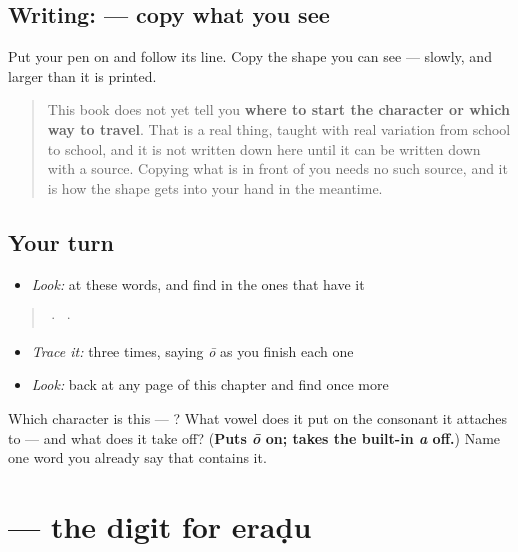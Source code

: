 \subsection*{Writing:  — copy what you see}
Put your pen on  and follow its line. Copy the shape you can see — slowly, and larger than it is printed.

\begin{quote}
This book does not yet tell you \textbf{where to start the character or which way to travel}. That is a real thing, taught with real variation from school to school, and it is not written down here until it can be written down with a source. Copying what is in front of you needs no such source, and it is how the shape gets into your hand in the meantime.
\end{quote}

\subsection*{Your turn}
\begin{itemize}
\raggedright
  \item \emph{Look:} at these words, and find  in the ones that have it
\end{itemize}

\begin{quote}
  ·    ·  
\end{quote}

\begin{itemize}
\raggedright
  \item \emph{Trace it:}  three times, saying \emph{ō} as you finish each one
  \item \emph{Look:} back at any page of this chapter and find  once more
\end{itemize}

\begin{tcolorbox}[breakable,colback=teal!4,colframe=teal!35!black,title={Before you move on}]
Which character is this — ? What vowel does it put on the consonant it attaches to — and what does it take off? (\textbf{Puts \emph{ō} on; takes the built-in \emph{a} off.}) Name one word you already say that contains it.
\end{tcolorbox}
\section[\texorpdfstring{\kn{೨} (2)}{೨ (2)}]{ — the digit for eraḍu}

